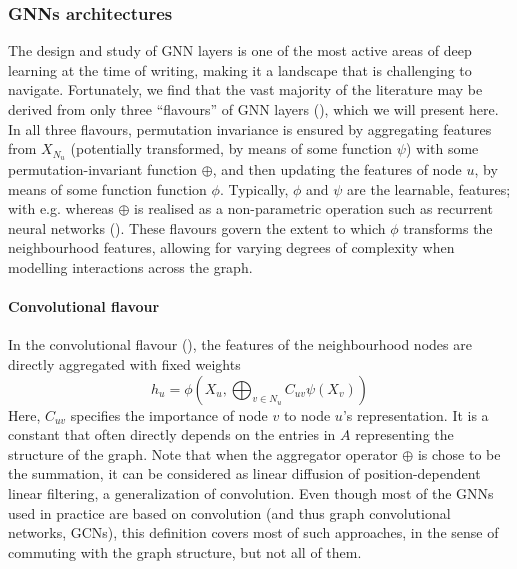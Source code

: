 \documentclass[binding=0.6cm]{sapthesis}
\newcommand{\mycite}[1]{(\cite{#1})}
\begin{document}
\subsubsection{GNNs architectures}
\label{sec:bg.gnn.gnn-archs}
The design and study of GNN layers is one of the most active areas of deep learning at the time of writing, making it a landscape that is challenging to navigate. Fortunately, we find that the vast majority of the literature may be derived from only three “flavours” of GNN layers \mycite{bronstein2021geometric}, which we will present here. In all three flavours, permutation invariance is ensured by aggregating features from $X_{N_u}$ (potentially transformed, by means of some function $\psi$) with some permutation-invariant function $\oplus$, and then updating the features of node $u$, by means of some function function $\phi$. Typically, $\phi$ and $\psi$ are the learnable, features; with e.g. whereas $\oplus$ is realised as a non-parametric operation such as recurrent neural networks (\cite{murphy2019janossy}). These flavours govern the extent to which $\phi$ transforms the neighbourhood features, allowing for varying degrees of complexity when modelling interactions across the graph.

\paragraph{Convolutional flavour}
\label{sec:bg.gnn.gcn}
In the convolutional flavour (\cite{kipf2016-semisupervised,defferrard2017-convolutional,wu2019-simplifying}), the features of the neighbourhood nodes are directly aggregated with fixed weights
\begin{equation}
    h_u = \phi \left( X_u, \bigoplus_{v \in N_u} C_{uv} \psi(X_v) \right)
\end{equation}
Here, $C_{uv}$ specifies the importance of node $v$ to node $u$’s representation. It is a constant that often directly depends on the entries in $A$ representing the structure of the graph. Note that when the aggregator operator $\oplus$ is chose to be the summation, it can be considered as linear diffusion of position-dependent linear filtering, a generalization of convolution. Even though most of the GNNs used in practice are based on convolution (and thus graph convolutional networks, GCNs), this definition covers most of such approaches, in the sense of commuting with the graph structure, but not all of them.
\end{document}
